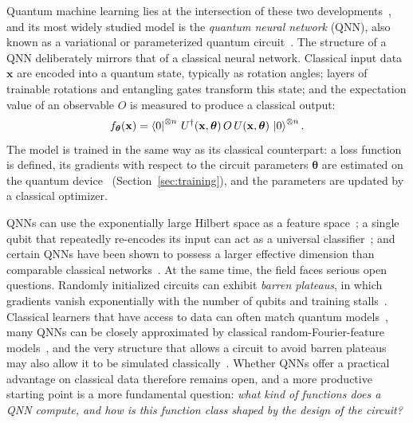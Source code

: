 \documentclass[12pt]{article}
\numberwithin{equation}{section}  %
\begin{document}
Quantum machine learning lies at the intersection of these two developments~\cite{biamonte2017quantum, schuld2021machine}, and its most widely studied model is the \emph{quantum neural network} (QNN), also known as a variational or parameterized quantum circuit~\cite{farhi2018classification, mitarai2018quantum, benedetti2019parameterized}. The structure of a QNN deliberately mirrors that of a classical neural network. Classical input data $\mathbf{x}$ are encoded into a quantum state, typically as rotation angles; layers of trainable rotations and entangling gates transform this state; and the expectation value of an observable $O$ is measured to produce a classical output:
\begin{equation}
f_{\boldsymbol{\theta}}(\mathbf{x}) = \bra{0}^{\otimes n}\, U^{\dagger}(\mathbf{x}, \boldsymbol{\theta})\, O\, U(\mathbf{x}, \boldsymbol{\theta})\, \ket{0}^{\otimes n}.
\label{eq:intro_qnn}
\end{equation}
The model is trained in the same way as its classical counterpart: a loss function is defined, its gradients with respect to the circuit parameters $\boldsymbol{\theta}$ are estimated on the quantum device~\cite{mitarai2018quantum} (Section~\ref{sec:training}), and the parameters are updated by a classical optimizer.

QNNs can use the exponentially large Hilbert space as a feature space~\cite{havlicek2019supervised, schuld2019quantum}; a single qubit that repeatedly re-encodes its input can act as a universal classifier~\cite{perezsalinas2020data}; and certain QNNs have been shown to possess a larger effective dimension than comparable classical networks~\cite{abbas2021power}. At the same time, the field faces serious open questions. Randomly initialized circuits can exhibit \emph{barren plateaus}, in which gradients vanish exponentially with the number of qubits and training stalls~\cite{mcclean2018barren}. Classical learners that have access to data can often match quantum models~\cite{huang2021power}, many QNNs can be closely approximated by classical random-Fourier-feature models~\cite{landman2023classically}, and the very structure that allows a circuit to avoid barren plateaus may also allow it to be simulated classically~\cite{cerezo2025does}. Whether QNNs offer a practical advantage on classical data therefore remains open, and a more productive starting point is a more fundamental question: \emph{what kind of functions does a QNN compute, and how is this function class shaped by the design of the circuit?}
\end{document}
